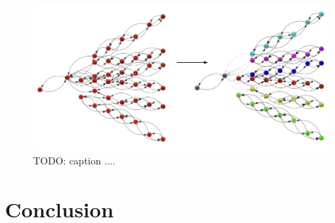 \begin{figure}[htbp]
   \centering
   \includegraphics[width=0.99\textwidth]{images/7-results/community-detection.png}
   \caption{TODO: caption ....}
   \label{fig:community-detection}%
\end{figure}





\section{Conclusion}



